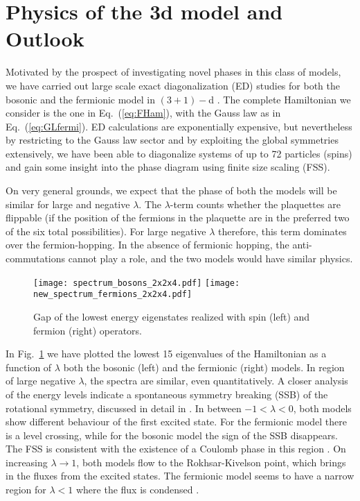 \documentclass[a4paper,11pt]{article}
\begin{document}
\section{Physics of the 3d model and Outlook}
 Motivated by the prospect of investigating novel phases in this class of models, we have carried out large
scale exact diagonalization (ED) studies for both the bosonic and the fermionic model in $(3+1)-$d \cite{Flink2021}.
The complete Hamiltonian we consider is the one in Eq.~(\ref{eq:FHam}), with the Gauss law as in Eq.~(\ref{eq:GLfermi}).
ED calculations are exponentially expensive, but nevertheless by restricting to the Gauss law sector and by exploiting 
the global symmetries extensively, we have been able to diagonalize systems of up to 72 particles (spins) and gain some 
insight into the phase diagram using finite size scaling (FSS). 

 On very general grounds, we expect that the phase of both the models will be similar for large and 
negative $\lambda$. The $\lambda$-term counts whether the plaquettes are
flippable (if the position of the fermions in the plaquette are in the preferred two of the six total possibilities). 
For large negative $\lambda$ therefore, this term dominates over the fermion-hopping. In the
absence of fermionic hopping, the anti-commutations cannot play a role, and the two models would have similar
physics. 

\begin{figure}[!tbh]
 \begin{center}
 \texttt{[image: spectrum\_bosons\_2x2x4.pdf]}
 \texttt{[image: new\_spectrum\_fermions\_2x2x4.pdf]}
 \end{center}
 \caption{Gap of the lowest energy eigenstates realized with spin (left) and fermion (right) operators.}
 \label{fig:phaseDiag}
\end{figure}

 In Fig.~\ref{fig:phaseDiag} we have plotted the lowest 15 eigenvalues of the Hamiltonian as a function of $\lambda$
 both the bosonic (left) and the fermionic (right) models. In region of large negative $\lambda$, the spectra
 are similar, even quantitatively. A closer analysis of the energy levels indicate a spontaneous symmetry breaking (SSB)
 of the rotational symmetry, discussed in detail in \cite{Flink2021}. In between $-1 < \lambda < 0$, both models 
 show different behaviour of the first excited state. For the fermionic model there is a level crossing, while 
 for the bosonic model the sign of the SSB disappears. The FSS is consistent with the
 existence of a Coulomb phase in this region \cite{Flink2021}. On increasing $\lambda \rightarrow 1$, both models
 flow to the Rokhsar-Kivelson point, which brings in the fluxes from the excited states. The fermionic model seems
 to have a narrow region for $\lambda <  1$ where the flux is condensed \cite{Flink2021}. 
\end{document}
